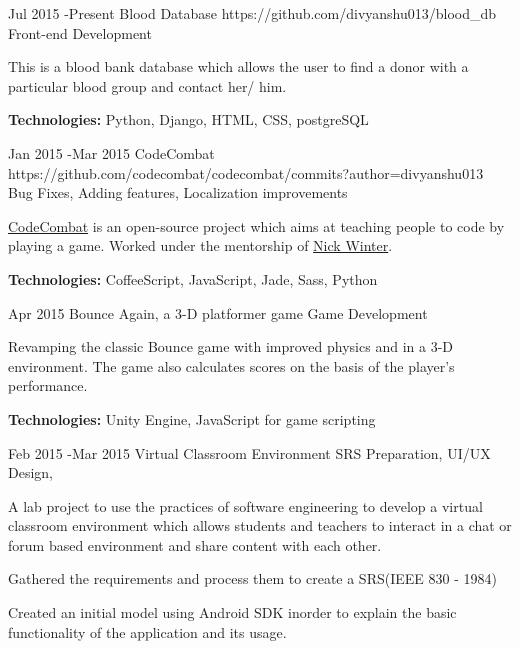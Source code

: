 \documentclass[10pt]{article} %
\begin{document}
\job
{Jul 2015 -}{Present}
{\color{slateblue} Blood Database }
{https://github.com/divyanshu013/blood_db}
{Front-end Development}
{This is a blood bank database which allows the user to find a donor with a particular blood group and contact her/ him.\\
\rule{0mm}{5mm}\textbf{Technologies:} Python, Django, HTML, CSS, postgreSQL }


\job
{Jan 2015 -}{Mar 2015}
{\color{slateblue} CodeCombat }
{https://github.com/codecombat/codecombat/commits?author=divyanshu013}
{Bug Fixes, Adding features, Localization improvements}
{{\color{slateblue}\href{http://codecombat.com/}{CodeCombat}} is an open-source project which aims at teaching people to code by playing a game. Worked under the mentorship of {\color{slateblue}\href{http://www.nickwinter.net/}{Nick Winter}}.\\
\rule{0mm}{5mm}\textbf{Technologies:} CoffeeScript, JavaScript, Jade, Sass, Python }


\job
{Apr 2015 }{}
{Bounce Again, a 3-D platformer game }
{}
{Game Development}
{Revamping the classic Bounce game with improved physics and in a 3-D environment. The game also calculates scores on the basis of the player's performance.\\
\rule{0mm}{5mm}\textbf{Technologies:} Unity Engine, JavaScript for game scripting }


\job
{Feb 2015 -}{Mar 2015}
{Virtual Classroom Environment}
{}
{SRS Preparation, UI/UX Design,  }
{

\begin{itemize-noindent}
\item{A lab project to use the practices of software engineering to develop a virtual classroom environment which allows students and teachers to interact in a chat or forum based environment and share content with each other.}
\item{Gathered the requirements and process them to create a SRS(IEEE 830 - 1984)}
\item{Created an initial model using Android SDK inorder to explain the basic functionality of the application and its usage.}
\end{itemize-noindent}
}

\end{document}
